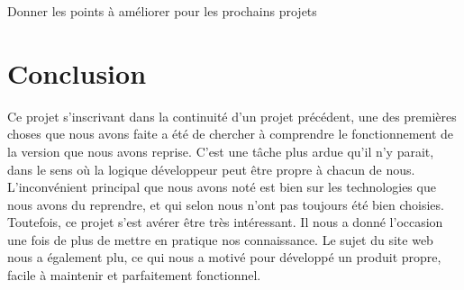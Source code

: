 \documentclass[twoside]{EPURapport}
\begin{document}
	Donner les points à améliorer pour les prochains projets

\chapter{Conclusion}

Ce projet s'inscrivant dans la continuité d'un projet précédent, une des premières choses que nous avons faite a été de chercher à comprendre le fonctionnement de la version que nous avons reprise. C'est une tâche plus ardue qu'il n'y parait, dans le sens où la logique développeur peut être propre à chacun de nous. L'inconvénient principal que nous avons noté est bien sur les technologies que nous avons du reprendre, et qui selon nous n'ont pas toujours été bien choisies.\\

Toutefois, ce projet s'est avérer être très intéressant. Il nous a donné l'occasion une fois de plus de mettre en pratique nos connaissance. Le sujet du site web nous a également plu, ce qui nous a motivé pour développé un produit propre, facile à maintenir et parfaitement fonctionnel.

\annexes
\end{document}
